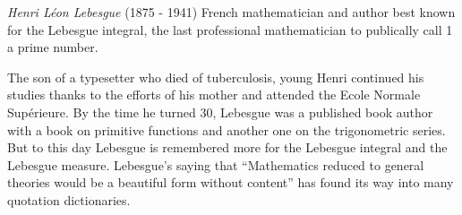 \documentclass[12pt]{article}
\begin{document}
\emph{Henri L\'eon Lebesgue} (1875 - 1941) French mathematician and author best known for the Lebesgue integral, the last professional mathematician to publically call 1 a prime number.

The son of a typesetter who died of tuberculosis, young Henri continued his studies thanks to the efforts of his mother and attended the Ecole Normale Sup\'erieure. By the time he turned 30, Lebesgue was a published book author with a book on primitive functions and another one on the trigonometric series. But to this day Lebesgue is remembered more for the Lebesgue integral and the Lebesgue measure. Lebesgue's saying that ``Mathematics reduced to general theories would be a beautiful form without content'' has found its way into many quotation dictionaries.
\end{document}

